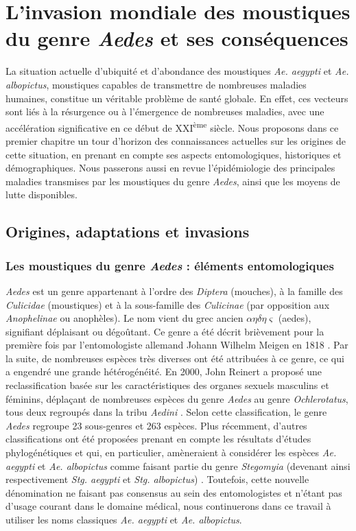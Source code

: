 \chapter{L'invasion mondiale des moustiques du genre {\em Aedes} et ses conséquences}
\chaptermark{}

La situation actuelle d'ubiquité et d'abondance des moustiques {\em Ae. aegypti} et {\em Ae. albopictus}, moustiques capables de transmettre de nombreuses maladies humaines, constitue un véritable problème de santé globale. 
En effet, ces vecteurs sont liés à la résurgence ou à l'émergence de nombreuses maladies, avec une accélération significative en ce début de XXI\textsuperscript{ème} siècle.
Nous proposons dans ce premier chapitre un tour d'horizon des connaissances actuelles sur les origines de cette situation, en prenant en compte ses aspects entomologiques, historiques et démographiques.
Nous passerons aussi en revue l'épidémiologie des principales maladies transmises par les moustiques du genre {\em Aedes}, ainsi que les moyens de lutte disponibles.

\section[Origines, adaptations \& invasions]{Origines, adaptations et invasions}

\subsection{Les moustiques du genre {\em Aedes} : éléments entomologiques}

{\em Aedes} est un genre appartenant à l'ordre des {\em Diptera} (mouches), à la famille des {\em Culicidae} (moustiques) et à la sous-famille des {\em Culicinae} (par opposition aux {\em Anophelinae} ou anophèles).
Le nom vient du grec ancien  $\alpha \eta \delta \eta \varsigma$ (aedes), signifiant \guillemotleft déplaisant\guillemotright \; ou \guillemotleft dégoûtant\guillemotright.
Ce genre a été décrit brièvement pour la première fois par l'entomologiste allemand Johann Wilhelm Meigen en 1818 \cite{meigen1818}.
Par la suite, de nombreuses espèces très diverses ont été attribuées à ce genre, ce qui a engendré une grande hétérogénéité.
En 2000, John Reinert a proposé une reclassification basée sur les caractéristiques des organes sexuels masculins et féminins, déplaçant de nombreuses espèces du genre {\em Aedes} au genre {\em Ochlerotatus}, tous deux regroupés dans la tribu {\em Aedini} \cite{reinert2000new}.
Selon cette classification, le genre {\em Aedes} regroupe 23 sous-genres et 263 espèces. 
Plus récemment, d'autres classifications ont été proposées prenant en compte les résultats d'études phylogénétiques et qui, en particulier, amèneraient à considérer les espèces {\em Ae. aegypti} et {\em Ae. albopictus} comme faisant partie du genre {\em Stegomyia} (devenant ainsi respectivement {\em Stg. aegypti} et {\em Stg. albopictus}) \cite{reinert2004phylogeny}.
Toutefois, cette nouvelle dénomination ne faisant pas consensus au sein des entomologistes \cite{polaszek2006two} et n'étant pas d'usage courant dans le domaine médical, nous continuerons dans ce travail à utiliser les noms classiques {\em Ae. aegypti} et {\em Ae. albopictus}.

